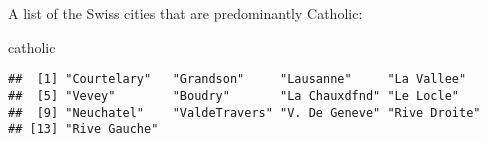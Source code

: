 \documentclass[]{article}
\newenvironment{Shaded}{\begin{snugshade}}{\end{snugshade}}
\newcommand{\NormalTok}[1]{#1}
\begin{document}
A list of the Swiss cities that are predominantly Catholic:

\begin{Shaded}
\begin{Highlighting}[]
\NormalTok{catholic}
\end{Highlighting}
\end{Shaded}

\begin{verbatim}
##  [1] "Courtelary"   "Grandson"     "Lausanne"     "La Vallee"   
##  [5] "Vevey"        "Boudry"       "La Chauxdfnd" "Le Locle"    
##  [9] "Neuchatel"    "ValdeTravers" "V. De Geneve" "Rive Droite" 
## [13] "Rive Gauche"
\end{verbatim}
\end{document}
